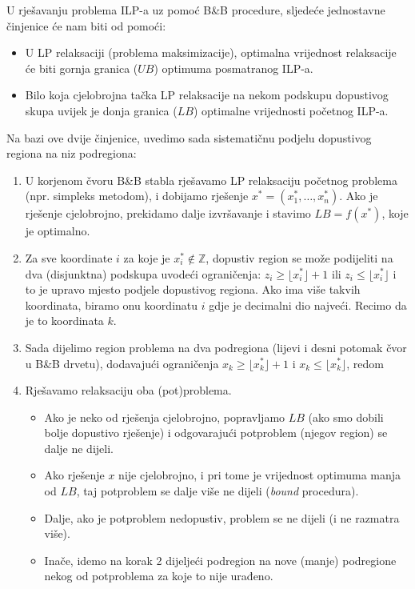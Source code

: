 \documentclass[a4paper, utf8, 11pt, colorlinks]{book}
\begin{document}
U rješavanju problema  ILP-a uz pomoć B\&B procedure, sljedeće jednostavne činjenice će nam biti od pomoći:
\begin{itemize}
    \item  U LP relaksaciji (problema 
           maksimizacije), optimalna vrijednost  relaksacije  će biti gornja granica ($UB$) optimuma posmatranog ILP-a. 
    \item  Bilo koja cjelobrojna tačka LP relaksacije na nekom podskupu  
           dopustivog skupa uvijek je  donja granica ($LB$) optimalne vrijednosti početnog ILP-a. 
\end{itemize}
Na bazi ove dvije činjenice, uvedimo sada sistematičnu podjelu dopustivog regiona na niz podregiona:
\begin{enumerate}
    \item U korjenom čvoru B\&B stabla rješavamo LP relaksaciju početnog problema     (npr. simpleks metodom), i dobijamo rješenje $x^*=(x^*_1, \ldots, x^*_n)$.   Ako je rješenje cjelobrojno, prekidamo dalje izvršavanje i stavimo $LB=f(x^*)$, koje je optimalno. %
    \item Za sve koordinate $i$ za koje je $x^*_i \not \in \mathbb{Z}$, dopustiv region se može podijeliti na dva (disjunktna) podskupa uvodeći ograničenja: $z_i \geq \lfloor x^*_i \rfloor + 1$ ili $z_i \leq \lfloor x^*_i \rfloor$ i to je upravo mjesto podjele dopustivog regiona. Ako ima više takvih koordinata, biramo onu koordinatu $i$ gdje je decimalni dio najveći.  Recimo da je to koordinata $k$.
    \item Sada dijelimo region problema na dva podregiona (lijevi i desni potomak čvor u B\&B drvetu), dodavajući 
          ograničenja $x_k \geq \lfloor x^*_k \rfloor + 1$ i $x_k \leq \lfloor x^*_k \rfloor$, redom
    \item Rješavamo relaksaciju oba (pot)problema. 
    \begin{itemize}
    	\item  Ako je neko od rješenja cjelobrojno, popravljamo $LB$ (ako smo dobili bolje dopustivo rješenje) i odgovarajući potproblem (njegov region) se dalje ne dijeli. 
    	\item Ako rješenje $x$ nije cjelobrojno, i pri tome je vrijednost optimuma manja od $LB$, taj potproblem se dalje više ne dijeli (\emph{bound} procedura). 
    	\item Dalje, ako je potproblem nedopustiv, problem se ne dijeli (i ne razmatra više). 
    	\item Inače, idemo na korak 2 dijeljeći podregion   na nove (manje) podregione nekog od potproblema za koje to nije urađeno.    
    \end{itemize}

\end{enumerate}
\end{document}
